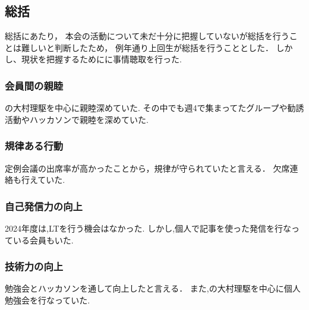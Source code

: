 \subsection*{\firstGrade{}総括}



\firstGrade{}総括にあたり，
本会の活動について未だ十分に把握していない\firstGrade{}が総括を行うことは難しいと判断したため，
例年通り上回生が総括を行うこととした．
しかし、現状を把握するために\firstGrade{}に事情聴取を行った.

\subsubsection*{会員間の親睦}
\firstGrade{}の大村理駆を中心に親睦深めていた.
その中でも週4で集まってたグループや勧誘活動やハッカソンで親睦を深めていた.


\subsubsection*{規律ある行動}
定例会議の出席率が高かったことから，規律が守られていたと言える．
欠席連絡も行えていた.

\subsubsection*{自己発信力の向上}
2024年度は,LTを行う機会はなかった.
しかし,個人で記事を使った発信を行なっている会員もいた.

\subsubsection*{技術力の向上}
勉強会とハッカソンを通して向上したと言える．
また,\firstGrade{}の大村理駆を中心に個人勉強会を行なっていた.